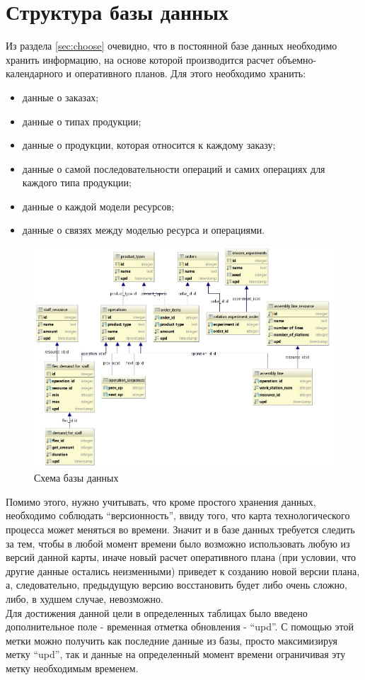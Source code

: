\section{Структура базы данных}

\indent Из раздела \ref{sec:choose} очевидно, что в постоянной базе данных необходимо хранить информацию, на основе которой производится расчет объемно-календарного и оперативного планов.
Для этого необходимо хранить:

\begin{itemize}
	\item данные о заказах;
	\item данные о типах продукции;
	\item данные о продукции, которая относится к каждому заказу;
	\item данные о самой последовательности операций и самих операциях для каждого типа продукции;
	\item данные о каждой модели ресурсов;
	\item данные о связях между моделью ресурса и операциями.
\end{itemize}

\begin{figure}[ht]
	\centering
	\includegraphics[width=\linewidth]{pics/databaseSchema.png}
	\caption{Схема базы данных}
	\label{fig:dbSchema}
\end{figure}

\indent Помимо этого, нужно учитывать, что кроме простого хранения данных, необходимо соблюдать ``версионность'', ввиду того, что карта технологического процесса может меняться во времени.
Значит и в базе данных требуется следить за тем, чтобы в любой момент времени было возможно использовать любую из версий данной карты, иначе новый расчет оперативного плана (при условии, что другие данные остались неизменными) приведет к созданию новой версии плана, а, следовательно, предыдущую версию восстановить будет либо очень сложно, либо, в худшем случае, невозможно.\\
\indent Для достижения данной цели в определенных таблицах было введено дополнительное поле - временная отметка обновления - ``upd''.
С помощью этой метки можно получить как последние данные из базы, просто максимизируя метку ``upd'', так и данные на определенный момент времени ограничивая эту метку необходимым временем.